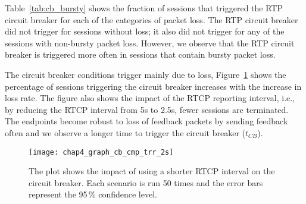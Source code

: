 Table~\ref{tab:cb_bursty} shows the fraction of sessions that triggered the
RTP circuit breaker for each of the categories of packet loss. The RTP circuit
breaker did not trigger for sessions without loss; it also did not trigger for
any of the sessions with non-bursty packet loss. However, we observe that the
RTP circuit breaker is triggered more often in sessions that contain bursty
packet loss. 

The circuit breaker conditions trigger mainly due to loss,
Figure~\ref{fig:short-rtcp} shows the percentage of sessions triggering the
circuit breaker increases with the increase in loss rate. The figure also
shows the impact of the RTCP reporting interval, i.e., by reducing the RTCP
interval from 5s to 2.5s, fewer sessions are terminated. The endpoints become
robust to loss of feedback packets by sending feedback often and we observe a
longer time to trigger the circuit breaker ($t_{CB}$).

\begin{figure}[!t]
  \centerline{
    {\texttt{[image: chap4\_graph\_cb\_cmp\_trr\_2s]}}
  }
  \caption{The plot shows the impact of using a shorter RTCP interval on the
  circuit breaker. Each scenario is run 50 times and the error bars represent
  the 95\,\% confidence level.}
  \label{fig:short-rtcp}
\end{figure}
